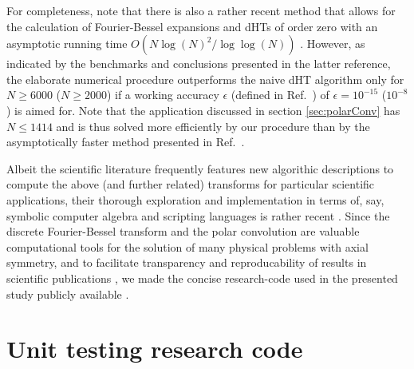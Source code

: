 \documentclass[12pt]{iopart}
\begin{document}
For completeness, note that there is also a rather recent method that allows
for the calculation of Fourier-Bessel expansions and dHTs of order zero with an
asymptotic running time $O(N \log(N)^2/\log\log(N))$ \cite{Townsend:2015}.
However, as indicated by the benchmarks and conclusions presented in the latter
reference, the elaborate numerical procedure outperforms the naive dHT
algorithm only for $N\geq 6000$ ($N\geq 2000$) if a working accuracy $\epsilon$
(defined in Ref.\ \cite{Townsend:2015}) of $\epsilon = 10^{-15}$ ($10^{-8}$) is
aimed for.  Note that the application discussed in section \ref{sec:polarConv}
has $N\leq 1414$ and is thus solved more efficiently by our procedure than by
the asymptotically faster method presented in Ref.\ \cite{Townsend:2015}.

Albeit the scientific literature frequently features new algorithic
descriptions to compute the above (and further related) transforms for
particular scientific applications, their thorough exploration and
implementation in terms of, say, symbolic computer algebra and scripting
languages is rather recent \cite{Dovlo:2015,Baddour:2017}.  Since the discrete
Fourier-Bessel transform and the polar convolution are valuable computational
tools for the solution of many physical problems with axial symmetry, 
and to facilitate transparency and reproducability of results in scientific
publications \cite{Barnes:2010,Ince:2012,Sandve:2013}, we made the concise
research-code used in the presented study publicly available
\cite{Melchert_gitHub_dFBT:2016}.


\appendix
\section{Unit testing research code}
\label{sec:appendixA}
\end{document}
